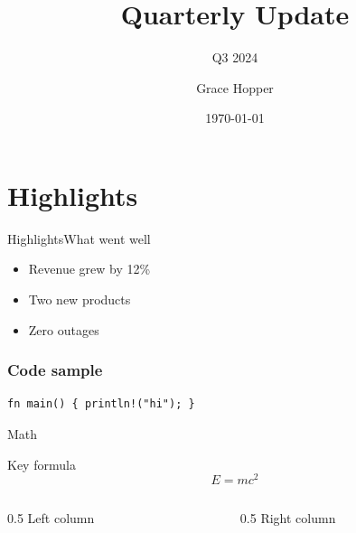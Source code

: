 \documentclass{beamer}
\title{Quarterly Update}
\subtitle{Q3 2024}
\author{Grace Hopper}
\institute{Example Corp}
\date{\today}
\begin{document}
\begin{frame}
  \titlepage
\end{frame}

\section{Highlights}
\begin{frame}{Highlights}{What went well}
  \begin{itemize}
    \item<1-> Revenue grew by 12\%
    \item<2-> Two new products \pause
    \item<3-> \alert{Zero} outages
  \end{itemize}
\end{frame}

\begin{frame}[fragile]
  \frametitle{Code sample}
  \begin{verbatim}
fn main() { println!("hi"); }
  \end{verbatim}
\end{frame}

\begin{frame}{Math}
  \begin{block}{Key formula}
    $$E = mc^2$$
  \end{block}
  \begin{columns}
    \begin{column}{0.5\textwidth}
      Left column
    \end{column}
    \begin{column}{0.5\textwidth}
      Right column
    \end{column}
  \end{columns}
\end{frame}
\end{document}
